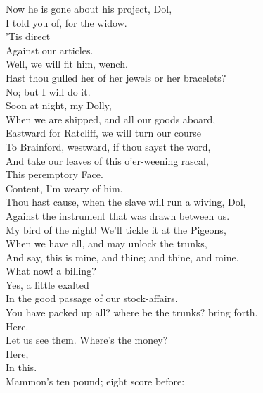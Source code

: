 \documentclass[a4paper,oneside,12pt]{memoir}
\begin{document}
\begin{drama*}
\subtlespeaks Now he is gone about his project, Dol,\\
I told you of, for the widow.\\
\dolspeaks {} 'Tis direct\\
Against our articles.\\
\subtlespeaks {} Well, we will fit him, wench.\\
Hast thou gulled her of her jewels or her bracelets?\\
\dolspeaks No; but I will do it.\\
\subtlespeaks {} Soon at night, my Dolly,\\
When we are shipped, and all our goods aboard,\\
Eastward for Ratcliff, we will turn our course\\
To Brainford, westward, if thou sayst the word,\\
And take our leaves of this o'er-weening rascal,\\
This peremptory Face.\\
\dolspeaks {} Content, I'm weary of him.\\
\subtlespeaks Thou hast cause, when the slave will run a wiving, Dol,\\
Against the instrument that was drawn between us.\\
My bird of the night! We'll tickle it at the Pigeons,\\
When we have all, and may unlock the trunks,\\
And say, this is mine, and thine; and thine, and mine.\\
\facespeaks What now! a billing?\\
\subtlespeaks {} Yes, a little exalted\\
In the good passage of our stock-affairs.\\
\facespeaks You have packed up all? where be the trunks? bring forth.\\
\subtlespeaks Here.\\
\facespeaks {} Let us see them. Where's the money?\\
\subtlespeaks {} Here,\\
In this.\\
\facespeaks {} Mammon's ten pound; eight score before:\\

\end{drama*}
\end{document}
